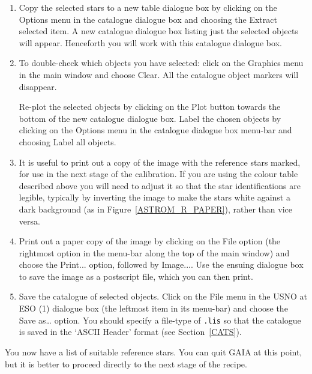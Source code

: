 \documentclass[twoside,11pt]{article}
\begin{document}
\begin{enumerate}
  \item Copy the selected stars to a new table dialogue box by clicking on
   the {\sf Options} menu in the catalogue dialogue box and choosing the
   {\sf Extract selected} item.  A new catalogue dialogue box listing just
   the selected objects will appear.  Henceforth you will work with this
   catalogue dialogue box.

  \item To double-check which objects you have selected: click on the {\sf
   Graphics} menu in the main window and choose {\sf Clear}.  All the
   catalogue object markers will disappear.

   Re-plot the selected objects by clicking on the {\sf Plot} button towards
   the bottom of the new catalogue dialogue box.  Label the chosen objects
   by clicking on the {\sf Options} menu in the catalogue dialogue box
   menu-bar and choosing {\sf Label all objects}.

  \item It is useful to print out a copy of the image with the reference
   stars marked, for use in the next stage of the calibration.  If you are
   using the colour table described above you will need to adjust it so
   that the star identifications are legible, typically by inverting the
   image to make the stars white against a dark background (as in
   Figure~\ref{ASTROM_R_PAPER}), rather than vice versa.

  \item Print out a paper copy of the image by clicking on the {\sf File}
   option (the rightmost option in the menu-bar along the top of the main
   window) and choose the {\sf Print...} option, followed by {\sf Image...}.
   Use the ensuing dialogue box to save the image as a postscript file,
   which you can then print.

  \item Save the catalogue of selected objects.  Click on the {\sf File}
   menu in the {\sf USNO at ESO (1)} dialogue box (the leftmost item in its
   menu-bar) and choose the {\sf Save as\ldots} option.  You should specify
   a file-type of {\tt .lis} so that the catalogue is saved in the `ASCII
   Header' format (see Section~\ref{CATS}).

\end{enumerate}

You now have a list of suitable reference stars. You can quit GAIA at this
point, but it is better to proceed directly to the next stage of the
recipe.
\end{document}

